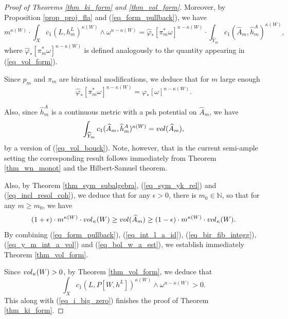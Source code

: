 \documentclass[10pt,a4paper]{amsart}
\newcommand{\nat}{\mathbb{N}}
\begin{document}
\begin{proof}[Proof of Theorems \ref{thm_ki_form} and \ref{thm_vol_form}]
		\par 
		Moreover, by Proposition \ref{prop_proj_fla} and (\ref{eq_form_pullback}), we have
		\begin{equation}\label{eq_int_l_a_id}
			m^{\kappa(W)} \cdot \int_X c_1(L, h^L_m)^{\kappa(W)} \wedge \omega^{n - \kappa(W)}
			=
			\widehat{\varphi}_{*}[ \pi_m^* \omega]^{n - \kappa(W)}
			\cdot
			\int_{\widehat{Y}_m} c_1(\widehat{A}_m, \widehat{h}^A_m)^{\kappa(W)},
		\end{equation}
		where $\widehat{\varphi}_{*}[ \pi_m^* \omega]^{n - \kappa(W)}$ is defined analogously to the quantity appearing in (\ref{eq_vol_form}).
		\par 
		Since $p_m$ and $\pi_m$ are birational modifications, we deduce that for $m$ large enough
		\begin{equation}\label{eq_bir_fib_integg}
			\widehat{\varphi}_{*}[ \pi_m^* \omega]^{n - \kappa(W)}
			=
			\varphi_{*} [\omega]^{n - \kappa(W)}.
		\end{equation}
		\par 
		Also, since $\widehat{h}^A_m$ is a continuous metric with a psh potential on $\widehat{A}_m$, we have
		\begin{equation}\label{eq_y_m_int_a_vol}
			\int_{\widehat{Y}_m} c_1(\widehat{A}_m, \widehat{h}^A_m)^{\kappa(W)}
			=
			{\rm{vol}}(\widehat{A}_m),
		\end{equation}
		by a version of (\ref{eq_vol_bouck}).
		Note, however, that in the current semi-ample setting the corresponding result follows immediately from Theorem \ref{thm_wn_monot} and the Hilbert-Samuel theorem.
		\par 
		Also, by Theorem \ref{thm_sym_subalgebra}, (\ref{eq_sym_yk_rel}) and (\ref{eq_incl_resol_coh}), we deduce that for any $\epsilon > 0$, there is $m_0 \in \nat$, so that for any $m \geq m_0$, we have
		\begin{equation}\label{eq_bol_w_a_est}
			(1 + \epsilon) 
			\cdot 
			m^{\kappa(W)}
			\cdot
			{\rm{vol}}_{\kappa}(W)
			\geq
			{\rm{vol}}(\widehat{A}_m)
			\geq
			(1 - \epsilon) 
			\cdot 
			m^{\kappa(W)}
			\cdot
			{\rm{vol}}_{\kappa}(W).
		\end{equation}
		By combining (\ref{eq_form_pullback}), (\ref{eq_int_l_a_id}), (\ref{eq_bir_fib_integg}), (\ref{eq_y_m_int_a_vol}) and (\ref{eq_bol_w_a_est}), we establish immediately Theorem \ref{thm_vol_form}.
		\par 
		Since ${\rm{vol}}_{\kappa}(W) > 0$, by Theorem \ref{thm_vol_form}, we deduce that
		\begin{equation}
			\int_X c_1(L, P[W, h^L])^{\kappa(W)} \wedge \omega^{n - \kappa(W)} > 0.
		\end{equation}
		This along with (\ref{eq_i_big_zero}) finishes the proof of Theorem \ref{thm_ki_form}.
	\end{proof}
\end{document}
